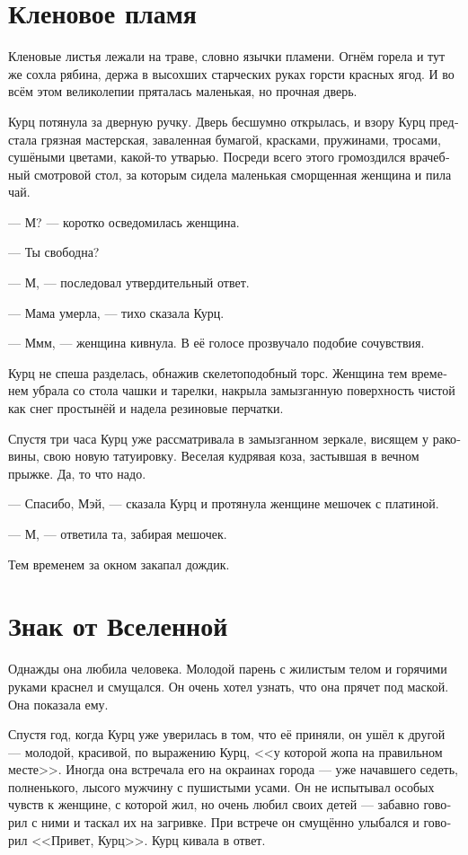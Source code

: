 \documentclass[a4paper,12pt,fleqn]{book}\usepackage{polyglossia}\setdefaultlanguage[babelshorthands=true]{russian}\setotherlanguage{english}\defaultfontfeatures{Ligatures=TeX,Mapping=tex-text}\usepackage{xcolor}\newcommand{\ml}[3]{#2}
\begin{document}
\section{Кленовое пламя}

Кленовые листья лежали на траве, словно язычки пламени.
Огнём горела и тут же сохла рябина, держа в высохших старческих руках горсти красных ягод.
И во всём этом великолепии пряталась маленькая, но прочная дверь.

Курц потянула за дверную ручку.
Дверь бесшумно открылась, и взору Курц предстала грязная мастерская, заваленная бумагой, красками, пружинами, тросами, сушёными цветами, какой-то утварью.
Посреди всего этого громоздился врачебный смотровой стол, за которым сидела маленькая сморщенная женщина и пила чай.

--- М? --- коротко осведомилась женщина.

--- Ты свободна?

--- М, --- последовал утвердительный ответ.

--- Мама умерла, --- тихо сказала Курц.

--- Ммм, --- женщина кивнула.
В её голосе прозвучало подобие сочувствия.

Курц не спеша разделась, обнажив скелетоподобный торс.
Женщина тем временем убрала со стола чашки и тарелки, накрыла замызганную поверхность чистой как снег простынёй и надела резиновые перчатки.

Спустя три часа Курц уже рассматривала в замызганном зеркале, висящем у раковины, свою новую татуировку.
Веселая кудрявая коза, застывшая в вечном прыжке.
Да, то что надо.

--- Спасибо, Мэй, --- сказала Курц и протянула женщине мешочек с платиной.

--- М, --- ответила та, забирая мешочек.

Тем временем за окном закапал дождик.

\section{Знак от Вселенной}

Однажды она любила человека.
Молодой парень с жилистым телом и горячими руками краснел и смущался.
Он очень хотел узнать, что она прячет под маской.
Она показала ему.

Спустя год, когда Курц уже уверилась в том, что её приняли, он ушёл к другой --- молодой, красивой, по выражению Курц, <<у которой жопа на правильном месте>>.
Иногда она встречала его на окраинах города --- уже начавшего седеть, полненького, лысого мужчину с пушистыми усами.
Он не испытывал особых чувств к женщине, с которой жил, но очень любил своих детей --- забавно говорил с ними и таскал их на загривке.
При встрече он смущённо улыбался и говорил <<Привет, Курц>>.
Курц кивала в ответ.
\end{document}
